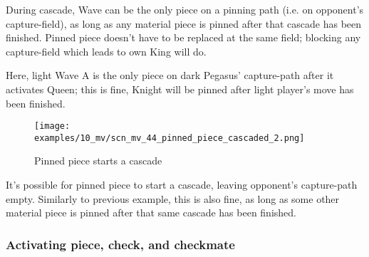 \vspace*{-0.5\baselineskip}
During cascade, Wave can be the only piece on a pinning path (i.e. on opponent's
capture-field), as long as any material piece is pinned after that cascade has been
finished. Pinned piece doesn't have to be replaced at the same field; blocking any
capture-field which leads to own King will do.

Here, light Wave A is the only piece on dark Pegasus' capture-path after it activates
Queen; this is fine, Knight will be pinned after light player's move has been finished.

\clearpage %

\vspace*{-2.3\baselineskip}
\noindent
\begin{figure}[!h]
\texttt{[image: examples/10\_mv/scn\_mv\_44\_pinned\_piece\_cascaded\_2.png]}
\caption{Pinned piece starts a cascade}
\label{fig:scn_mv_44_pinned_piece_cascaded_2}
\end{figure}

It's possible for pinned piece to start a cascade, leaving opponent's capture-path
empty. Similarly to previous example, this is also fine, as long as some other
material piece is pinned after that same cascade has been finished.

\clearpage %

\subsubsection*{Activating piece, check, and checkmate}
\label{sec:Miranda's veil/Wave/Cascading Waves/Activating piece, check, and checkmate}

